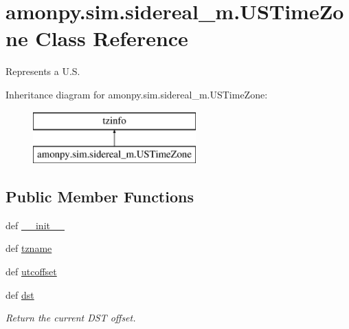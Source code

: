 \hypertarget{classamonpy_1_1sim_1_1sidereal__m_1_1_u_s_time_zone}{\section{amonpy.\-sim.\-sidereal\-\_\-m.\-U\-S\-Time\-Zone Class Reference}
\label{classamonpy_1_1sim_1_1sidereal__m_1_1_u_s_time_zone}
}


Represents a U.\-S.  


Inheritance diagram for amonpy.\-sim.\-sidereal\-\_\-m.\-U\-S\-Time\-Zone\-:\begin{figure}[H]
\begin{center}
\leavevmode
\includegraphics[height=2.000000cm]{d4/dc8/classamonpy_1_1sim_1_1sidereal__m_1_1_u_s_time_zone}
\end{center}
\end{figure}
\subsection*{Public Member Functions}
\begin{DoxyCompactItemize}
\item 
def \hyperlink{classamonpy_1_1sim_1_1sidereal__m_1_1_u_s_time_zone_a657f7d4310310a11181f37c0dd88d836}{\-\_\-\-\_\-init\-\_\-\-\_\-}
\item 
def \hyperlink{classamonpy_1_1sim_1_1sidereal__m_1_1_u_s_time_zone_a23cff28f7e915cbedd135a6532801355}{tzname}
\item 
def \hyperlink{classamonpy_1_1sim_1_1sidereal__m_1_1_u_s_time_zone_a34b5a8e398a9fe241a92566fa1c0563b}{utcoffset}
\item 
def \hyperlink{classamonpy_1_1sim_1_1sidereal__m_1_1_u_s_time_zone_ae41bd74cd959a63c935a76f5d7f38f9c}{dst}
\begin{DoxyCompactList}\small\item\em Return the current D\-S\-T offset. \end{DoxyCompactList}\end{DoxyCompactItemize}
